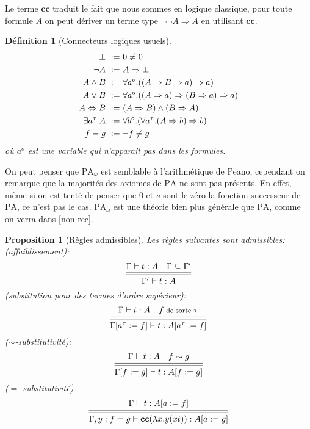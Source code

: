 \documentclass[a4paper,12pt]{article}
\newtheorem{prop}[theo]{Proposition}
\newtheorem{defi}[theo]{Définition}
\theoremstyle{rmqstyle}
\newcommand{\PA}{\mathrm{PA}}
\renewcommand{\implies}{\Rightarrow}
\renewcommand{\iff}{\Leftrightarrow}
\newcommand{\cc}{\mathbf{cc}}
\begin{document}
Le terme $\cc$ traduit le fait que nous sommes en logique classique, pour toute formule $A$ on peut dériver un terme type $\neg \neg A \implies A$ en utilisant $\cc$.

\begin{defi}[Connecteurs logiques usuels]
\begin{align*}
\setlength\itemsep{ -1 em}
\bot \ :=& \ 0 \neq 0 \\
\neg A \ :=& \ A \implies \bot \\
A \land B \ :=& \ \forall a^o.((A \implies B \implies a) \implies a)\\
A \lor B \ :=& \ \forall a^o.((A \implies a) \implies (B \implies a) \implies a)\\
A \iff B \ :=& \ (A \implies B) \land (B \implies A)\\
\exists a^\tau. A \ :=& \ \forall b^o.(\forall a^\tau. (A \implies b) \implies b)\\
f = g \ :=& \ \neg f \neq g
\end{align*}
où $a^o$ est une variable qui n'apparait pas dans les formules. 
\end{defi}

On peut penser que $\PA_\omega$ est semblable à l'arithmétique de Peano, cependant on remarque que la majorités des axiomes de $\PA$ ne sont pas présents. En effet, même si on est tenté de penser que $0$ et $s$ sont le zéro la fonction successeur de $\PA$, ce n'est pas le cas. $\PA_\omega$ est une théorie bien plus générale que $\PA$, comme on verra dans \ref{non rec}. 

\begin{prop}[Règles admissibles]
Les règles suivantes sont admissibles:\\
(affaiblissement):
$$ 
\begin{prooftree}[center=false]
\hypo{\Gamma \vdash t : A \quad \Gamma \subseteq \Gamma'}
\infer[double]1{\Gamma' \vdash t : A}
\end{prooftree}
$$
(substitution pour des termes d'ordre supérieur):
$$
\begin{prooftree}[center=false]
\hypo{\Gamma \vdash t : A \quad {\footnotesize f \text{ de sorte } \tau}}
\infer[double]1{\Gamma[a^\tau := f] \vdash t : A[a^\tau := f]}
\end{prooftree}
$$
($\sim$-substitutivité):
$$
\begin{prooftree}[center=false]
\hypo{\Gamma \vdash t : A \quad f \sim g}
\infer[double]1{\Gamma[f := g] \vdash t : A[f := g]}
\end{prooftree}
$$
($=$-substitutivité)
$$
\begin{prooftree}[center=false]
\hypo{\Gamma \vdash t : A[a := f]}
\infer[double]1{\Gamma, y : f = g \vdash \cc(\lambda x. y(xt)) : A[a := g]}
\end{prooftree}
$$
\end{prop}
\end{document}
